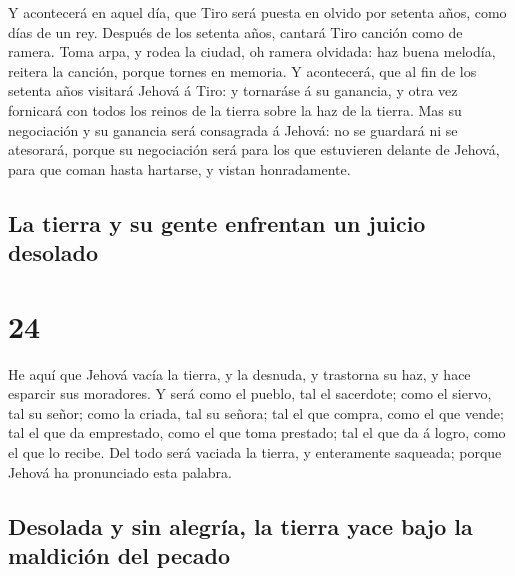  Y acontecerá en aquel día, que Tiro será puesta en olvido
por setenta años, como días de un rey. Después de los setenta años,
cantará Tiro canción como de ramera.  Toma arpa, y rodea la
ciudad, oh ramera olvidada: haz buena melodía, reitera la canción,
porque tornes en memoria.  Y acontecerá, que al fin de los
setenta años visitará Jehová á Tiro: y tornaráse á su ganancia, y otra
vez fornicará con todos los reinos de la tierra sobre la haz de la
tierra.  Mas su negociación y su ganancia será consagrada á
Jehová: no se guardará ni se atesorará, porque su negociación será para
los que estuvieren delante de Jehová, para que coman hasta hartarse, y
vistan honradamente.

\hypertarget{la-tierra-y-su-gente-enfrentan-un-juicio-desolado}{%
\subsection{La tierra y su gente enfrentan un juicio
desolado}\label{la-tierra-y-su-gente-enfrentan-un-juicio-desolado}}

\hypertarget{section-23}{%
\section{24}\label{section-23}}

 He aquí que Jehová vacía la tierra, y la desnuda, y
trastorna su haz, y hace esparcir sus moradores.  Y será
como el pueblo, tal el sacerdote; como el siervo, tal su señor; como la
criada, tal su señora; tal el que compra, como el que vende; tal el que
da emprestado, como el que toma prestado; tal el que da á logro, como el
que lo recibe.  Del todo será vaciada la tierra, y
enteramente saqueada; porque Jehová ha pronunciado esta palabra.

\hypertarget{desolada-y-sin-alegruxeda-la-tierra-yace-bajo-la-maldiciuxf3n-del-pecado}{%
\subsection{Desolada y sin alegría, la tierra yace bajo la maldición del
pecado}\label{desolada-y-sin-alegruxeda-la-tierra-yace-bajo-la-maldiciuxf3n-del-pecado}}

